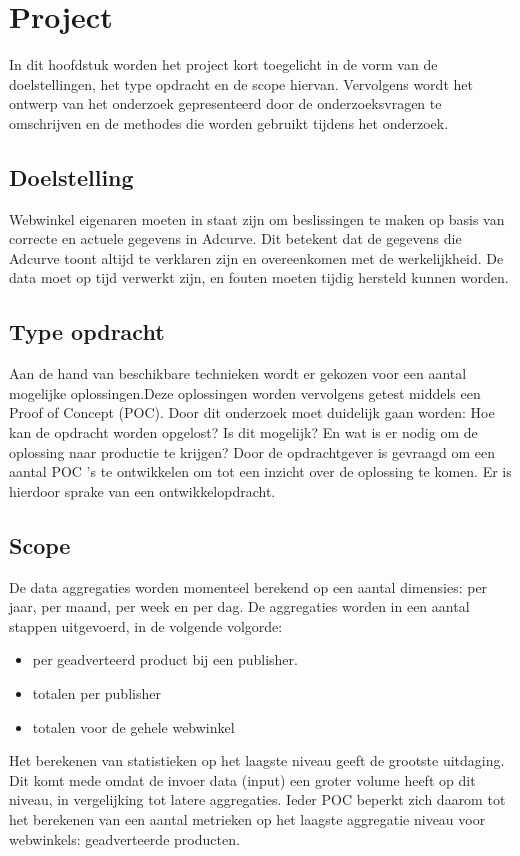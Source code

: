 \chapter{Project}

In dit hoofdstuk worden het project kort toegelicht in de vorm van de doelstellingen, het type opdracht en de scope hiervan. Vervolgens wordt het ontwerp van het onderzoek gepresenteerd door de onderzoeksvragen te omschrijven en de methodes die worden gebruikt tijdens het onderzoek.

\section{Doelstelling} %
\label{sec:doelstelling}

Webwinkel eigenaren moeten in staat zijn om beslissingen te maken op basis van correcte en actuele gegevens in Adcurve. Dit betekent dat de gegevens die Adcurve toont altijd te verklaren zijn en overeenkomen met de werkelijkheid. De data moet op tijd verwerkt zijn, en fouten moeten tijdig hersteld kunnen worden.

\section{Type opdracht}

Aan de hand van beschikbare technieken wordt er gekozen voor een aantal mogelijke oplossingen.\newline Deze oplossingen worden vervolgens getest middels een Proof of Concept (POC). Door dit onderzoek moet duidelijk gaan worden: Hoe kan de opdracht worden opgelost? Is dit mogelijk? En wat is er nodig om de oplossing naar productie te krijgen? Door de opdrachtgever is gevraagd om een aantal POC 's te ontwikkelen om tot een inzicht over de oplossing te komen. Er is hierdoor sprake van een ontwikkelopdracht.


\section{Scope}

De data aggregaties worden momenteel berekend op een aantal dimensies: per jaar, per maand, per week en per dag. De aggregaties worden in een aantal stappen uitgevoerd, in de volgende volgorde:
\begin{itemize}
\item per geadverteerd product bij een publisher.
\item totalen per publisher
\item totalen voor de gehele webwinkel
\end{itemize}
Het berekenen van statistieken op het laagste niveau geeft de grootste uitdaging. Dit komt mede omdat de invoer data (input) een groter volume heeft op dit niveau, in vergelijking tot latere aggregaties. Ieder POC beperkt zich daarom tot het berekenen van een aantal metrieken op het laagste aggregatie niveau voor webwinkels: geadverteerde producten.

